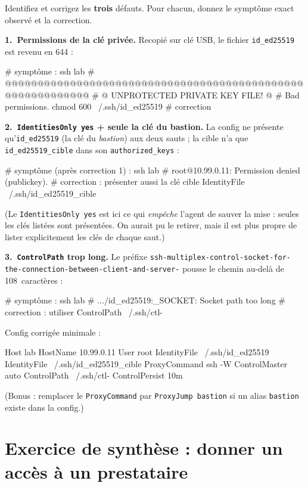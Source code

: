 \documentclass[a4paper,10pt]{exam}
\begin{document}
\begin{questions}
\question Identifiez et corrigez les \textbf{trois} défauts. Pour chacun, donnez le
symptôme exact observé et la correction.
\begin{solution}
\textbf{1.~Permissions de la clé privée.} Recopié sur clé USB, le fichier
\texttt{id\_ed25519} est revenu en 644 :
\begin{bashcode}
# symptôme :
ssh lab
# @@@@@@@@@@@@@@@@@@@@@@@@@@@@@@@@@@@@@@@@@@@@@@@@@@@@@@@@@@@
# @         UNPROTECTED PRIVATE KEY FILE!          @
# Bad permissions.
chmod 600 ~/.ssh/id_ed25519   # correction
\end{bashcode}
\textbf{2.~\texttt{IdentitiesOnly yes} + seule la clé du bastion.} La config ne présente
qu'\texttt{id\_ed25519} (la clé du \emph{bastion}) aux deux sauts ; la cible n'a que
\texttt{id\_ed25519\_cible} dans son \texttt{authorized\_keys} :
\begin{bashcode}
# symptôme (après correction 1) :
ssh lab
# root@10.99.0.11: Permission denied (publickey).
# correction : présenter aussi la clé cible
IdentityFile ~/.ssh/id_ed25519_cible
\end{bashcode}
(Le \texttt{IdentitiesOnly yes} est ici ce qui \emph{empêche} l'agent de sauver la mise :
seules les clés listées sont présentées. On aurait pu le retirer, mais il est plus propre
de lister explicitement les clés de chaque saut.)

\textbf{3.~\texttt{ControlPath} trop long.} Le préfixe
\texttt{ssh-multiplex-control-socket-for-the-connection-between-client-and-server-}
pousse le chemin au-delà de 108~caractères :
\begin{bashcode}
# symptôme :
ssh lab
# .../id_ed25519:_SOCKET: Socket path too long
# correction : utiliser %
ControlPath ~/.ssh/ctl-%
\end{bashcode}
Config corrigée minimale :
\begin{bashcode}
Host lab
    HostName 10.99.0.11
    User root
    IdentityFile ~/.ssh/id_ed25519
    IdentityFile ~/.ssh/id_ed25519_cible
    ProxyCommand ssh -W %
    ControlMaster auto
    ControlPath ~/.ssh/ctl-%
    ControlPersist 10m
\end{bashcode}
(Bonus : remplacer le \texttt{ProxyCommand} par \texttt{ProxyJump bastion} si un alias
\texttt{bastion} existe dans la config.)
\end{solution}
\end{questions}

\section{Exercice de synthèse : donner un accès à un prestataire}
\end{document}
